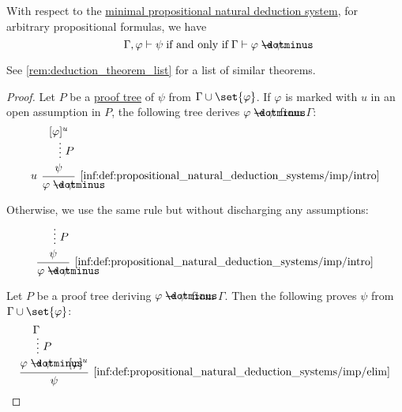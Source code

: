 \begin{theorem}\label{thm:propositional_syntactic_deduction_theorem}
  With respect to the \hyperref[def:propositional_natural_deduction_systems]{minimal propositional natural deduction system}, for arbitrary propositional formulas, we have
  \begin{equation*}
    \Gamma, \varphi \vdash \psi \T{if and only if} \Gamma \vdash \varphi \synimplies \psi.
  \end{equation*}
\end{theorem}
\begin{comments}
  \item See \cref{rem:deduction_theorem_list} for a list of similar theorems.
\end{comments}
\begin{proof}
  \SufficiencySubProof Let \( P \) be a \hyperref[def:propositional_natural_deduction_proof_tree]{proof tree} of \( \psi \) from \( \Gamma \cup \set{ \varphi } \). If \( \varphi \) is marked with \( u \) in an open assumption in \( P \), the following tree derives \( \varphi \synimplies \psi \) from \( \Gamma \):
  \begin{equation*}
    \begin{prooftree}
      \hypo{ [\varphi]^u }
      \ellipsis { \( P \) } { \psi }
      \infer[left label=\( u \)]1[\ref{inf:def:propositional_natural_deduction_systems/imp/intro}]{ \varphi \synimplies \psi }
    \end{prooftree}
  \end{equation*}

  Otherwise, we use the same rule but without discharging any assumptions:
  \begin{equation*}
    \begin{prooftree}
      \hypo{}
      \ellipsis { \( P \) } { \psi }
      \infer1[\ref{inf:def:propositional_natural_deduction_systems/imp/intro}]{ \varphi \synimplies \psi }
    \end{prooftree}
  \end{equation*}

  \NecessitySubProof Let \( P \) be a proof tree deriving \( \varphi \synimplies \psi \) from \( \Gamma \). Then the following proves \( \psi \) from \( \Gamma \cup \set{ \varphi } \):
  \begin{equation*}
    \begin{prooftree}
      \hypo {\Gamma}
      \ellipsis { \( P \) } { \varphi \synimplies \psi }

      \hypo { [\varphi]^u }
      \infer2[\ref{inf:def:propositional_natural_deduction_systems/imp/elim}]{ \psi }
    \end{prooftree}
  \end{equation*}
\end{proof}

